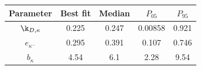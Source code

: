 \begin{tabular}{ccccc}
\toprule
Parameter & Best fit & Median & $P_{05}$ & $P_{95}$\\
\midrule
$\k_{D,\kappa}$ & 0.225 & 0.247 & 0.00858 & 0.921\\
$e_{\kappa^{-}}$ & 0.295 & 0.391 & 0.107 & 0.746\\
$b_{\kappa}$ & 4.54 & 6.1 & 2.28 & 9.54\\
\bottomrule
\end{tabular}
